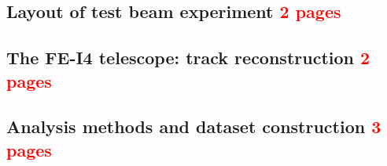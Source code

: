 		\subsection{Layout of test beam experiment \textcolor{red}{ 2 pages}} 
		\subsection{The FE-I4 telescope: track reconstruction \textcolor{red}{ 2 pages}}
		\subsection{Analysis methods and dataset construction \textcolor{red}{ 3 pages}}
		
%
%
%
